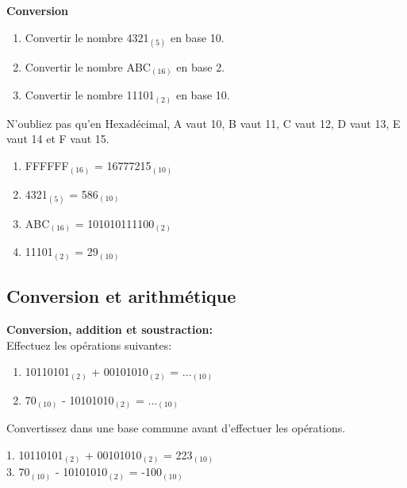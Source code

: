 \begin{Exercice}[10 minutes]  \textbf{Conversion }\\
    \begin{enumerate}
        \item Convertir le nombre 4321$_{(5)}$ en base 10.
        \item Convertir le nombre ABC$_{(16)}$ en base 2.
        \item Convertir le nombre 11101$_{(2)}$ en base 10.
    \end{enumerate}
    
        \begin{conseil}
            N'oubliez pas qu'en Hexadécimal, A vaut 10, B vaut 11, C vaut 12, D vaut 13, E vaut 14 et F vaut 15.
    \end{conseil}

    \begin{solution}
        \begin{enumerate}
            \item FFFFFF$_{(16)}$ = 16777215$_{(10)}$
            \item 4321$_{(5)}$ = 586$_{(10)}$
            \item ABC$_{(16)}$ = 101010111100$_{(2)}$
            \item 11101$_{(2)}$ = 29$_{(10)}$
        \end{enumerate}
    \end{solution}
\end{Exercice}

\subsection{Conversion et arithmétique}
\begin{Exercice}[5 minutes] \textbf{Conversion, addition et soustraction:}\\
    Effectuez les opérations suivantes:
    \begin{enumerate}
        \item 10110101$_{(2)}$ + 00101010$_{(2)}$ = ...$_{(10)}$
        \item 70$_{(10)}$ - 10101010$_{(2)}$ = ...$_{(10)}$
    \end{enumerate}
        \begin{conseil}
        Convertissez dans une base commune avant d'effectuer les opérations.
    \end{conseil}
        
    \begin{solution}
        1. 10110101$_{(2)}$ + 00101010$_{(2)}$ = 223$_{(10)}$\\
        3. 70$_{(10)}$ - 10101010$_{(2)}$ = -100$_{(10)}$
    \end{solution}
\end{Exercice}


